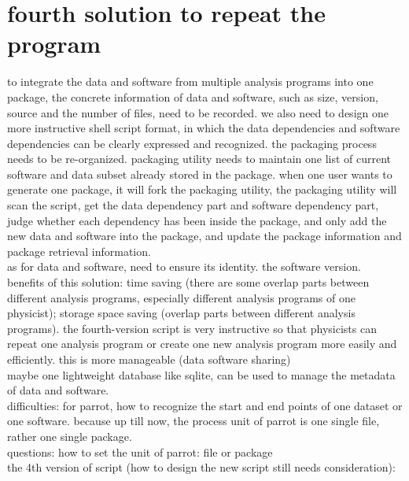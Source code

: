 \documentclass{article}
\begin{document}
\section{fourth solution to repeat the program}
to integrate the data and software from multiple analysis programs into one package, the concrete information of data and software, such as size, version, source and the number of files, need to be recorded. we also need to design one more instructive shell script format, in which the data dependencies and software dependencies can be clearly expressed and recognized. the packaging process needs to be re-organized. packaging utility needs to maintain one list of current software and data subset already stored in the package. when one user wants to generate one package, it will fork the packaging utility, the packaging utility will scan the script, get the data dependency part and software dependency part, judge whether each dependency has been inside the package, and only add the new data and software into the package, and update the package information and package retrieval information.\\

as for data and software, need to ensure its identity. the software version.\\

benefits of this solution: time saving (there are some overlap parts between different analysis programs, especially different analysis programs of one physicist); storage space saving (overlap parts between different analysis programs). the fourth-version script is very instructive so that physicists can repeat one analysis program or create one new analysis program more easily and efficiently.  this is more manageable (data software sharing)\\

maybe one lightweight database like sqlite, can be used to manage the metadata of data and software. \\

difficulties: for parrot, how to recognize the start and end points of one dataset or one software. because up till now, the process unit of parrot is one single file, rather one single package.\\

questions: how to set the unit of parrot: file or package\\

the 4th version of script (how to design the new script still needs consideration):\\
\end{document}
